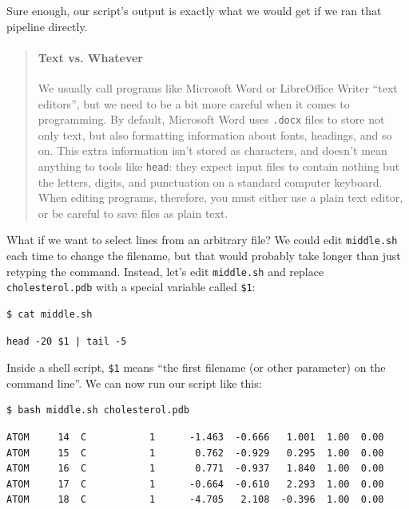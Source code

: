 \documentclass[]{book}
\begin{document}
Sure enough, our script's output is exactly what we would get if we ran
that pipeline directly.

\begin{quote}
\mbox{}\paragraph{Text vs. Whatever}

We usually call programs like Microsoft Word or LibreOffice Writer
``text editors'', but we need to be a bit more careful when it comes to
programming. By default, Microsoft Word uses \texttt{.docx} files to
store not only text, but also formatting information about fonts,
headings, and so on. This extra information isn't stored as characters,
and doesn't mean anything to tools like \texttt{head}: they expect input
files to contain nothing but the letters, digits, and punctuation on a
standard computer keyboard. When editing programs, therefore, you must
either use a plain text editor, or be careful to save files as plain
text.
\end{quote}

What if we want to select lines from an arbitrary file? We could edit
\texttt{middle.sh} each time to change the filename, but that would
probably take longer than just retyping the command. Instead, let's edit
\texttt{middle.sh} and replace \texttt{cholesterol.pdb} with a special
variable called \texttt{\$1}:

\begin{verbatim}
$ cat middle.sh
\end{verbatim}

\begin{verbatim}
head -20 $1 | tail -5
\end{verbatim}

Inside a shell script, \texttt{\$1} means ``the first filename (or other
parameter) on the command line''. We can now run our script like this:

\begin{verbatim}
$ bash middle.sh cholesterol.pdb
\end{verbatim}

\begin{verbatim}
ATOM     14  C           1      -1.463  -0.666   1.001  1.00  0.00
ATOM     15  C           1       0.762  -0.929   0.295  1.00  0.00
ATOM     16  C           1       0.771  -0.937   1.840  1.00  0.00
ATOM     17  C           1      -0.664  -0.610   2.293  1.00  0.00
ATOM     18  C           1      -4.705   2.108  -0.396  1.00  0.00
\end{verbatim}
\end{document}
